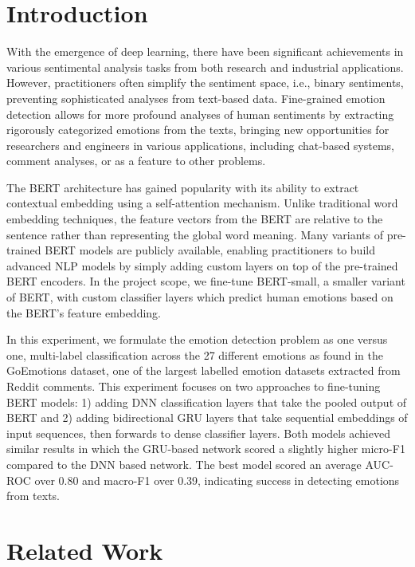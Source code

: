 \documentclass[conference]{IEEEtran}
\begin{document}
\section{Introduction}
With the emergence of deep learning, there have been significant achievements in various sentimental analysis tasks from both research and industrial applications. However, practitioners often simplify the sentiment space, i.e., binary sentiments, preventing sophisticated analyses from text-based data. Fine-grained emotion detection allows for more profound analyses of human sentiments by extracting rigorously categorized emotions from the texts, bringing new opportunities for researchers and engineers in various applications, including chat-based systems, comment analyses, or as a feature to other problems. 

The BERT architecture has gained popularity with its ability to extract contextual embedding using a self-attention mechanism\cite{DBLP:journals/corr/abs-1810-04805}\cite {DBLP:journals/corr/VaswaniSPUJGKP17}. Unlike traditional word embedding techniques, the feature vectors from the BERT are relative to the sentence rather than representing the global word meaning. Many variants of pre-trained BERT models are publicly available, enabling practitioners to build advanced NLP models by simply adding custom layers on top of the pre-trained BERT encoders. In the project scope, we fine-tune BERT-small\cite{bhargava2021generalization}\cite{DBLP:journals/corr/abs-1908-08962}, a smaller variant of BERT, with custom classifier layers which predict human emotions based on the BERT's feature embedding. 

In this experiment, we formulate the emotion detection problem as one versus one, multi-label classification across the 27 different emotions as found in the GoEmotions dataset\cite{DBLP:journals/corr/abs-2005-00547}, one of the largest labelled emotion datasets extracted from Reddit comments. This experiment focuses on two approaches to fine-tuning BERT models: 1) adding DNN classification layers that take the pooled output of BERT and 2) adding bidirectional GRU\cite{DBLP:journals/corr/ChoMBB14} layers that take sequential embeddings of input sequences, then forwards to dense classifier layers. Both models achieved similar results in which the GRU-based network scored a slightly higher micro-F1 compared to the DNN based network. The best model scored an average AUC-ROC over 0.80 and macro-F1 over 0.39, indicating success in detecting emotions from texts. 

\section{Related Work}
\end{document}
